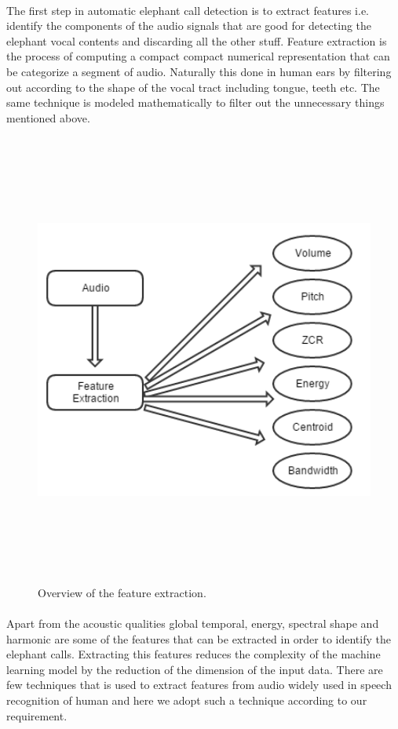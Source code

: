 \documentclass[12pt]{article}
\numberwithin{figure}{section}
\numberwithin{table}{section}
\begin{document}
\paragraph{}
The first step in automatic elephant call detection is to extract features i.e. identify the components of the audio signals that are good for detecting the elephant vocal contents and discarding all the other stuff. Feature extraction is the process of computing a compact compact numerical representation that can be categorize a segment of audio. Naturally this done in human ears by filtering out according to the shape of the vocal tract including tongue, teeth etc. The same technique is modeled mathematically to filter out the unnecessary things mentioned above. 

\begin{figure}[H]
\centering
\includegraphics[width=12cm,height=15cm,keepaspectratio]{feature_extraction.png}
\caption{Overview of the feature extraction.}
\label{feature_extraction}
\end{figure}

\paragraph{}
Apart from the acoustic qualities global temporal, energy, spectral shape and harmonic  are some of the features that can be extracted in order to identify the elephant calls. Extracting this features reduces the complexity of the machine learning model by the reduction of the dimension of the input data. There are few techniques that is used to extract features from audio widely used in speech recognition of human and here we adopt such a technique according to our requirement.
 
\end{document}
